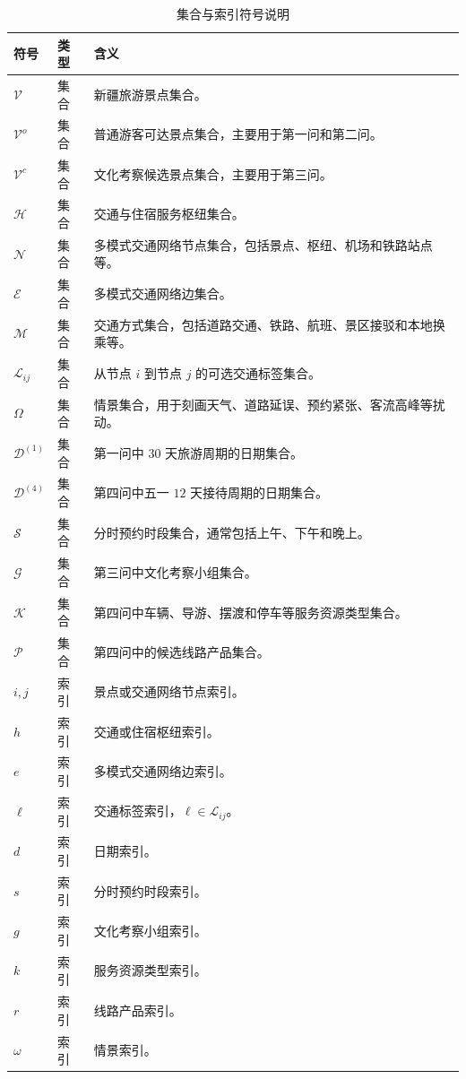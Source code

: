 \documentclass[UTF8,zihao=-4,a4paper]{ctexart}
\begin{document}
\begin{table}[htbp]
    \centering
    \caption{集合与索引符号说明}
    \label{tab:notation_sets}
    \small
    \renewcommand{\arraystretch}{1.18}
    \setlength{\tabcolsep}{5pt}
    \begin{tabularx}{\textwidth}{L{3.0cm} L{3.2cm} Y}
        \toprule
        符号 & 类型 & 含义 \\
        \midrule
        $\mathcal{V}$ & 集合 & 新疆旅游景点集合。 \\
        $\mathcal{V}^{o}$ & 集合 & 普通游客可达景点集合，主要用于第一问和第二问。 \\
        $\mathcal{V}^{c}$ & 集合 & 文化考察候选景点集合，主要用于第三问。 \\
        $\mathcal{H}$ & 集合 & 交通与住宿服务枢纽集合。 \\
        $\mathcal{N}$ & 集合 & 多模式交通网络节点集合，包括景点、枢纽、机场和铁路站点等。 \\
        $\mathcal{E}$ & 集合 & 多模式交通网络边集合。 \\
        $\mathcal{M}$ & 集合 & 交通方式集合，包括道路交通、铁路、航班、景区接驳和本地换乘等。 \\
        $\mathcal{L}_{ij}$ & 集合 & 从节点 $i$ 到节点 $j$ 的可选交通标签集合。 \\
        $\Omega$ & 集合 & 情景集合，用于刻画天气、道路延误、预约紧张、客流高峰等扰动。 \\
        $\mathcal{D}^{(1)}$ & 集合 & 第一问中 $30$ 天旅游周期的日期集合。 \\
        $\mathcal{D}^{(4)}$ & 集合 & 第四问中五一 $12$ 天接待周期的日期集合。 \\
        $\mathcal{S}$ & 集合 & 分时预约时段集合，通常包括上午、下午和晚上。 \\
        $\mathcal{G}$ & 集合 & 第三问中文化考察小组集合。 \\
        $\mathcal{K}$ & 集合 & 第四问中车辆、导游、摆渡和停车等服务资源类型集合。 \\
        $\mathcal{P}$ & 集合 & 第四问中的候选线路产品集合。 \\
        $i,j$ & 索引 & 景点或交通网络节点索引。 \\
        $h$ & 索引 & 交通或住宿枢纽索引。 \\
        $e$ & 索引 & 多模式交通网络边索引。 \\
        $\ell$ & 索引 & 交通标签索引，$\ell\in \mathcal{L}_{ij}$。 \\
        $d$ & 索引 & 日期索引。 \\
        $s$ & 索引 & 分时预约时段索引。 \\
        $g$ & 索引 & 文化考察小组索引。 \\
        $k$ & 索引 & 服务资源类型索引。 \\
        $r$ & 索引 & 线路产品索引。 \\
        $\omega$ & 索引 & 情景索引。 \\
        \bottomrule
    \end{tabularx}
\end{table}
\end{document}
